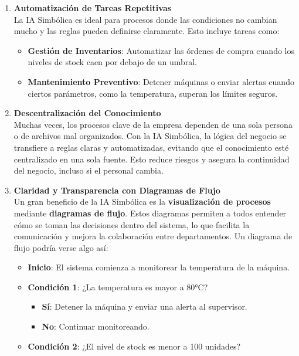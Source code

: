 \documentclass[
  10pt,
  letterpaper,
]{book}
\providecommand{\tightlist}{%
  \setlength{\itemsep}{0pt}\setlength{\parskip}{0pt}}\usepackage{longtable,booktabs,array}
\begin{document}
\begin{enumerate}
\def\labelenumi{\arabic{enumi}.}
\item
  \textbf{Automatización de Tareas Repetitivas}\\
  La IA Simbólica es ideal para procesos donde las condiciones no
  cambian mucho y las reglas pueden definirse claramente. Esto incluye
  tareas como:

  \begin{itemize}
  \tightlist
  \item
    \textbf{Gestión de Inventarios}: Automatizar las órdenes de compra
    cuando los niveles de stock caen por debajo de un umbral.
  \item
    \textbf{Mantenimiento Preventivo}: Detener máquinas o enviar alertas
    cuando ciertos parámetros, como la temperatura, superan los límites
    seguros.
  \end{itemize}
\item
  \textbf{Descentralización del Conocimiento}\\
  Muchas veces, los procesos clave de la empresa dependen de una sola
  persona o de archivos mal organizados. Con la IA Simbólica, la lógica
  del negocio se transfiere a reglas claras y automatizadas, evitando
  que el conocimiento esté centralizado en una sola fuente. Esto reduce
  riesgos y asegura la continuidad del negocio, incluso si el personal
  cambia.
\item
  \textbf{Claridad y Transparencia con Diagramas de Flujo}\\
  Un gran beneficio de la IA Simbólica es la \textbf{visualización de
  procesos} mediante \textbf{diagramas de flujo}. Estos diagramas
  permiten a todos entender cómo se toman las decisiones dentro del
  sistema, lo que facilita la comunicación y mejora la colaboración
  entre departamentos. Un diagrama de flujo podría verse algo así:

  \begin{itemize}
  \tightlist
  \item
    \textbf{Inicio}: El sistema comienza a monitorear la temperatura de
    la máquina.
  \item
    \textbf{Condición 1}: ¿La temperatura es mayor a 80°C?

    \begin{itemize}
    \tightlist
    \item
      \textbf{Sí}: Detener la máquina y enviar una alerta al supervisor.
    \item
      \textbf{No}: Continuar monitoreando.
    \end{itemize}
  \item
    \textbf{Condición 2}: ¿El nivel de stock es menor a 100 unidades?


\end{itemize}
\end{enumerate}
\end{document}
